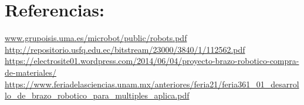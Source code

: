 \documentclass[14pt,a4paper]{article}
\begin{document}
\section{Referencias:}
\url{www.grupoisis.uma.es/microbot/public/robots.pdf}\\

\url{http://repositorio.usfq.edu.ec/bitstream/23000/3840/1/112562.pdf}\\

\url{https://electrosite01.wordpress.com/2014/06/04/proyecto-brazo-robotico-compra-de-materiales/}\\

\url{https://www.feriadelasciencias.unam.mx/anteriores/feria21/feria361_01_desarrollo_de_brazo_robotico_para_multiples_aplica.pdf}
\end{document}
